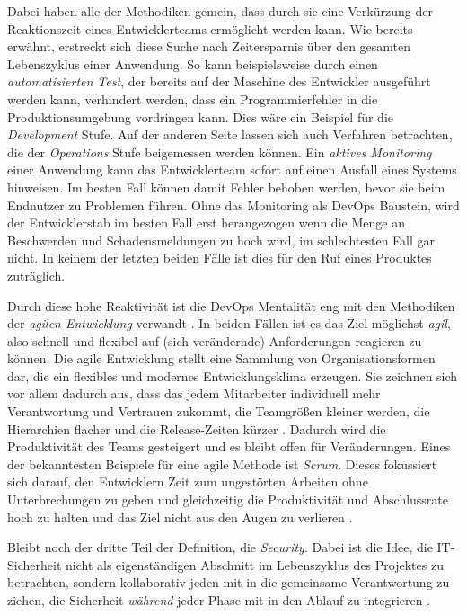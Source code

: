 Dabei haben alle der Methodiken gemein, dass durch sie eine Verkürzung der Reaktionszeit eines Entwicklerteams ermöglicht werden kann. 
Wie bereits erwähnt, erstreckt sich diese Suche nach Zeitersparnis über den gesamten Lebenszyklus einer Anwendung. So kann beispielsweise durch einen \emph{automatisierten Test}, der bereits auf der Maschine des Entwickler ausgeführt werden kann, verhindert werden, dass ein Programmierfehler in die Produktionsumgebung vordringen kann. Dies wäre ein Beispiel für die \emph{Development} Stufe. Auf der anderen Seite lassen sich auch Verfahren betrachten, die der \emph{Operations} Stufe beigemessen werden können. Ein \emph{aktives Monitoring} einer Anwendung kann das Entwicklerteam sofort auf einen Ausfall eines Systems hinweisen. Im besten Fall können damit Fehler behoben werden, bevor sie beim Endnutzer zu Problemen führen. Ohne das Monitoring als DevOps Baustein, wird der Entwicklerstab im besten Fall erst herangezogen wenn die Menge an Beschwerden und Schadensmeldungen zu hoch wird, im schlechtesten Fall gar nicht. In keinem der letzten beiden Fälle ist dies für den Ruf eines Produktes zuträglich.

Durch diese hohe Reaktivität ist die DevOps Mentalität eng mit den Methodiken der \emph{agilen Entwicklung} verwandt \cite{haufe-lexwaregmbhcokgAgileMethodenDefinition}. In beiden Fällen ist es das Ziel möglichst \emph{agil}, also schnell und flexibel auf (sich verändernde) Anforderungen reagieren zu können.
Die agile Entwicklung stellt eine Sammlung von Organisationsformen dar, die ein flexibles und modernes Entwicklungsklima erzeugen. Sie zeichnen sich vor allem dadurch aus, dass das jedem Mitarbeiter individuell mehr Verantwortung und Vertrauen zukommt, die Teamgrößen kleiner werden, die Hierarchien flacher und die Release-Zeiten kürzer \cite{haufe-lexwaregmbhcokgAgileMethodenDefinition}. Dadurch wird die Produktivität des Teams gesteigert und es bleibt offen für Veränderungen. Eines der bekanntesten Beispiele für eine agile Methode ist \emph{Scrum}. Dieses fokussiert sich darauf, den Entwicklern Zeit zum ungestörten Arbeiten ohne Unterbrechungen zu geben und gleichzeitig die Produktivität und Abschlussrate hoch zu halten und das Ziel nicht aus den Augen zu verlieren \cite{froemlingAgileMethodenWas2021}.

Bleibt noch der dritte Teil der Definition, die \emph{Security}. Dabei ist die Idee, die IT-Sicherheit nicht als eigenständigen Abschnitt im Lebenszyklus des Projektes zu betrachten, sondern kollaborativ jeden mit in die gemeinsame Verantwortung zu ziehen, die Sicherheit \emph{während} jeder Phase mit in den Ablauf zu integrieren \cite{redheadWasIstDevSecOps}.

